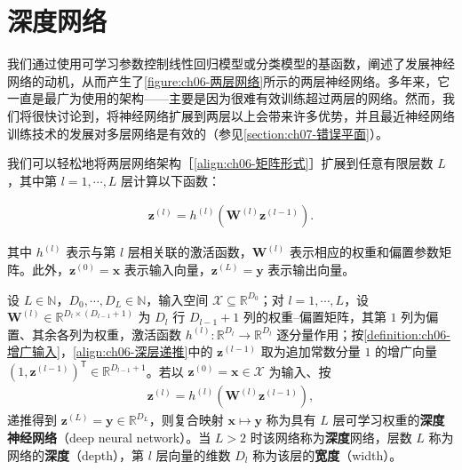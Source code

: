 \documentclass[../../main.tex]{subfiles}
\begin{document}
\section{深度网络}\label{section:ch06-深度网络}

我们通过使用可学习参数控制线性回归模型或分类模型的基函数，阐述了发展神经网络的动机，从而产生了\cref{figure:ch06-两层网络}所示的两层神经网络。多年来，它一直是最广为使用的架构——主要是因为很难有效训练超过两层的网络。然而，我们将很快讨论到，将神经网络扩展到两层以上会带来许多优势，并且最近神经网络训练技术的发展对多层网络是有效的（参见\cref{section:ch07-错误平面}）。

我们可以轻松地将两层网络架构［\eqref{align:ch06-矩阵形式}］扩展到任意有限层数 $L$，其中第 $l=1,\cdots,L$ 层计算以下函数：

\begin{align}
\boldsymbol{z}^{(l)}=h^{(l)}\!\left(\boldsymbol{W}^{(l)}\boldsymbol{z}^{(l-1)}\right).
\end{align}

其中 $h^{(l)}$ 表示与第 $l$ 层相关联的激活函数，$\boldsymbol{W}^{(l)}$ 表示相应的权重和偏置参数矩阵。此外，$\boldsymbol{z}^{(0)}=\boldsymbol{x}$ 表示输入向量，$\boldsymbol{z}^{(L)}=\boldsymbol{y}$ 表示输出向量。

\begin{definition}[深度神经网络]\label{definition:ch06-深度网络}
设 $L\in\mathbb{N}$，$D_{0},\cdots,D_{L}\in\mathbb{N}$，输入空间 $\mathcal{X}\subseteq\mathbb{R}^{D_{0}}$；对 $l=1,\cdots,L$，设 $\boldsymbol{W}^{(l)}\in\mathbb{R}^{D_{l}\times(D_{l-1}+1)}$ 为 $D_{l}$ 行 $D_{l-1}+1$ 列的权重--偏置矩阵，其第 $1$ 列为偏置、其余各列为权重，激活函数 $h^{(l)}:\mathbb{R}^{D_{l}}\to\mathbb{R}^{D_{l}}$ 逐分量作用；按\cref{definition:ch06-增广输入}，\eqref{align:ch06-深层递推}中的 $\boldsymbol{z}^{(l-1)}$ 取为追加常数分量 $1$ 的增广向量 $(1,\boldsymbol{z}^{(l-1)})^{\mathsf T}\in\mathbb{R}^{D_{l-1}+1}$。若以 $\boldsymbol{z}^{(0)}=\boldsymbol{x}\in\mathcal{X}$ 为输入、按
\begin{align}
\boldsymbol{z}^{(l)}=h^{(l)}\!\left(\boldsymbol{W}^{(l)}\boldsymbol{z}^{(l-1)}\right),
\label{align:ch06-深层递推}
\end{align}
递推得到 $\boldsymbol{z}^{(L)}=\boldsymbol{y}\in\mathbb{R}^{D_{L}}$，则复合映射 $\boldsymbol{x}\mapsto\boldsymbol{y}$ 称为具有 $L$ 层可学习权重的\textbf{深度神经网络}（deep neural network）。当 $L>2$ 时该网络称为\textbf{深度}网络，层数 $L$ 称为网络的\textbf{深度}（depth），第 $l$ 层向量的维数 $D_{l}$ 称为该层的\textbf{宽度}（width）。
\end{definition}
\end{document}
